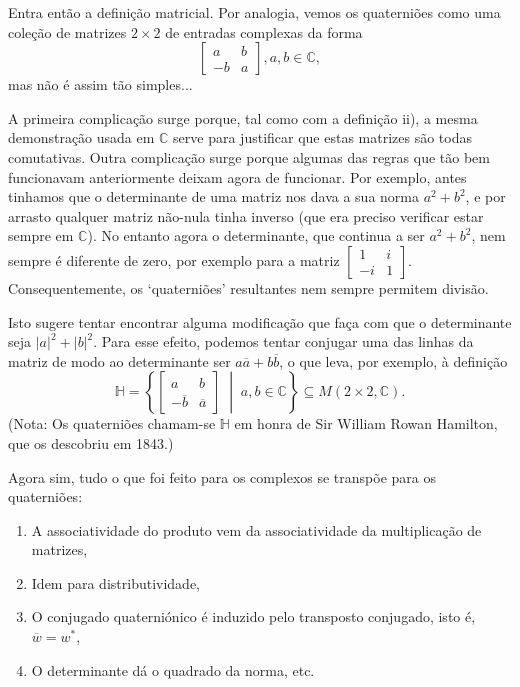 \documentclass{article}
\newcommand{\C}{\mathbb{C}}
\renewcommand{\H}{\mathbb{H}}
\begin{document}
Entra então a definição matricial. Por analogia, vemos os quaterniões como uma coleção de matrizes $2 \times 2$ de entradas complexas da forma
\[\begin{bmatrix} a & b \\ -b & a \end{bmatrix}, a, b \in \C,\]
mas não é assim tão simples...

A primeira complicação surge porque, tal como com a definição ii),  a mesma demonstração usada em $\C$ serve para justificar que estas matrizes são todas comutativas. Outra complicação surge porque algumas das regras que tão bem funcionavam anteriormente deixam agora de funcionar. Por exemplo, antes tinhamos que o determinante de uma matriz nos dava a sua norma $a^2 + b^2$, e por arrasto qualquer matriz não-nula tinha inverso (que era preciso verificar estar sempre em $\C$). No entanto agora o determinante, que continua a ser $a^2 + b^2$, nem sempre é diferente de zero, por exemplo para a matriz $\begin{bmatrix} 1 & i \\ -i & 1 \end{bmatrix}$. Consequentemente, os `quaterniões' resultantes nem sempre permitem divisão.

Isto sugere tentar encontrar alguma modificação que faça com que o determinante seja $\lvert a \rvert^2 + \lvert b \rvert^2$. Para esse efeito, podemos tentar conjugar uma das linhas da matriz de modo ao determinante ser $a \overline{a} + b \overline{b}$, o que leva, por exemplo, à definição
\[\H = \left\{ \begin{bmatrix} a & b \\ -\overline{b} & \overline{a} \end{bmatrix} \;\middle|\; a, b \in \C \right\} \subseteq M(2 \times 2, \C).\]
(Nota: Os quaterniões chamam-se $\H$ em honra de Sir William Rowan Hamilton, que os descobriu em 1843.)

Agora sim, tudo o que foi feito para os complexos se transpõe para os quaterniões:
\begin{enumerate}[label=\roman*)]
\item A associatividade do produto vem da associatividade da multiplicação de matrizes,
\item Idem para distributividade,
\item O conjugado quaterniónico é induzido pelo transposto conjugado, isto é, $\overline{w} = w^*$,
\item O determinante dá o quadrado da norma, etc.
\end{enumerate}
\end{document}

